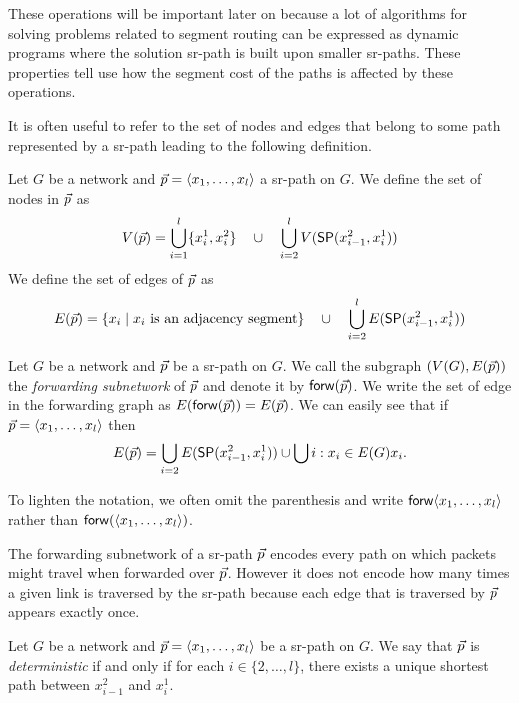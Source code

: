 These operations will be important later on because a lot of algorithms for solving problems related to segment routing
can be expressed as dynamic programs where the solution sr-path is built upon smaller sr-paths. These properties tell
use how the segment cost of the paths is affected by these operations.

It is often useful to refer to the set of nodes and edges that belong to some path represented by a sr-path leading
to the following definition.

\begin{definition}
Let $G$ be a network and $\vec{p} = \langle x_1, \ldots, x_l \rangle$ a sr-path on $G$. We define the set of nodes in $\vec{p}$ as
$$
V(\vec{p}) = \bigcup_{i = 1}^l \{x^1_i, x^2_i \} \quad \cup \quad \bigcup_{i = 2}^l V(\mathsf{SP}(x^2_{i - 1}, x^1_i))
$$
We define the set of edges of $\vec{p}$ as
$$
E(\vec{p}) = \left\{ x_i \mid \textrm{$x_i$ is an adjacency segment} \right\} \quad \cup \quad \bigcup_{i = 2}^l E(\mathsf{SP}(x^2_{i - 1}, x^1_i))
$$
\end{definition}

\begin{definition}
Let $G$ be a network and $\vec{p}$ be a sr-path on $G$. We call the subgraph $(V(G), E(\vec{p}))$ the \emph{forwarding
subnetwork} of $\vec{p}$ and denote it by $\mathsf{forw}(\vec{p})$. We write the set of edge in the forwarding graph as
$E(\mathsf{forw}(\vec{p})) = E(\vec{p})$. We can easily see that if $\vec{p} = \langle x_1, \ldots, x_l \rangle$ then
$$
E(\vec{p}) = \bigcup_{i = 2} E(\mathsf{SP}(x^2_{i - 1}, x^1_i)) \cup \bigcup{i : x_i \in E(G)} x_i.
$$
\end{definition}

To lighten the notation, we often omit the parenthesis and write $\mathsf{forw} \langle x_1, \ldots, x_l \rangle$ rather than
$\mathsf{forw}(\langle x_1, \ldots, x_l \rangle)$.

The forwarding subnetwork of a sr-path $\vec{p}$ encodes every path on which packets might travel when forwarded over $\vec{p}$.
However it does not encode how many times a given link is traversed by the sr-path because each edge that is traversed by $\vec{p}$ 
appears exactly once.

\begin{definition}
Let $G$ be a network and $\vec{p} = \langle x_1, \ldots, x_l \rangle$ be a sr-path on $G$. We say that $\vec{p}$ is \emph{deterministic} if and only if
for each $i \in \{2, \ldots, l\}$, there exists a unique shortest path between $x^2_{i - 1}$ and $x^1_i$.
\end{definition}

